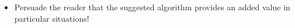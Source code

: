 \documentclass[a4paper]{article}
\begin{document}

\begin{itemize}
\item Persuade the reader that the suggested algorithm provides an added value in particular situations!
\end{itemize}



\end{document}
